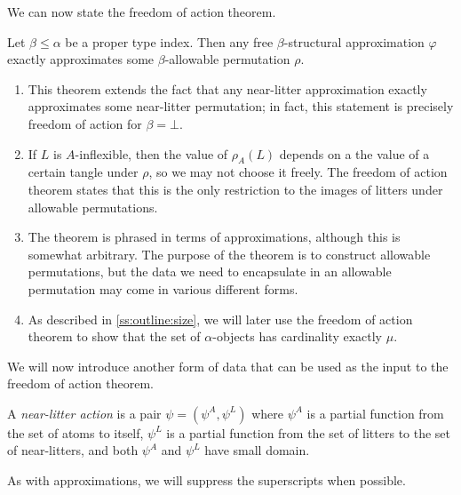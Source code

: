 We can now state the freedom of action theorem.

\begin{theorem}
    \label{thm:foa}
    Let \( \beta \leq \alpha \) be a proper type index.
    Then any free \( \beta \)-structural approximation \( \varphi \) exactly approximates some \( \beta \)-allowable permutation \( \rho \).
\end{theorem}

\begin{remarks}
    \begin{enumerate}
        \item This theorem extends the fact that any near-litter approximation exactly approximates some near-litter permutation; in fact, this statement is precisely freedom of action for \( \beta = \bot \).
        \item If \( L \) is \( A \)-inflexible, then the value of \( \rho_A(L) \) depends on a the value of a certain tangle under \( \rho \), so we may not choose it freely.
        The freedom of action theorem states that this is the only restriction to the images of litters under allowable permutations.
        \item The theorem is phrased in terms of approximations, although this is somewhat arbitrary.
        The purpose of the theorem is to construct allowable permutations, but the data we need to encapsulate in an allowable permutation may come in various different forms.
        \item As described in \cref{ss:outline:size}, we will later use the freedom of action theorem to show that the set of \( \alpha \)-objects has cardinality exactly \( \mu \).
    \end{enumerate}
\end{remarks}

We will now introduce another form of data that can be used as the input to the freedom of action theorem.

\begin{definition}
    A \emph{near-litter action} is a pair \( \psi = (\psi^A, \psi^L) \) where \( \psi^A \) is a partial function from the set of atoms to itself, \( \psi^L \) is a partial function from the set of litters to the set of near-litters, and both \( \psi^A \) and \( \psi^L \) have small domain.
\end{definition}

As with approximations, we will suppress the superscripts when possible.

